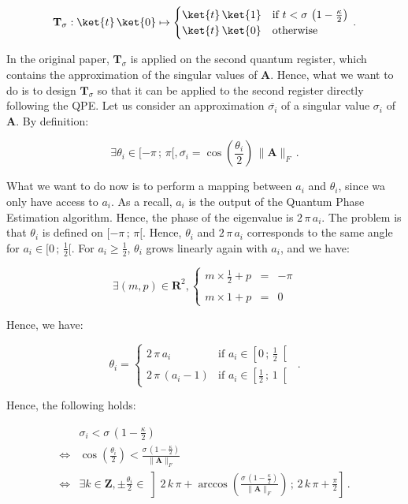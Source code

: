 \documentclass[11pt, a4paper]{article}
\begin{document}
                \[\mathbf{T}_\sigma:\ket{t}\,\ket{0}\mapsto\begin{cases}\ket{t}\,\ket{1} &\text{if } t < \sigma\,\left(1-\frac\kappa2\right)\\\ket{t}\,\ket{0}&\text{otherwise}\end{cases}\,.\]
                
                In the original paper, \(\mathbf{T}_\sigma\) is applied on the second quantum register, which contains the approximation of the singular values of \(\mathbf{A}\). Hence, what we want to do is to design \(\mathbf{T}_\sigma\) so that it can be applied to the second register directly following the QPE. Let us consider an approximation \(\overline{\sigma_i}\) of a singular value \(\sigma_i\) of \(\mathbf{A}\). By definition:
                
                \[\exists\theta_i\in[-\pi\,;\,\pi[,\overline{\sigma_i}=\cos\left(\frac{\theta_i}{2}\right)\,\|\mathbf{A}\|_F\,.\]
                
                What we want to do now is to perform a mapping between \(a_i\) and \(\theta_i\), since wa only have access to \(a_i\). As a recall, \(a_i\) is the output of the Quantum Phase Estimation algorithm. Hence, the phase of the eigenvalue is \(2\,\pi\,a_i\). The problem is that \(\theta_i\) is defined on \([-\pi\,;\,\pi[\). Hence, \(\theta_i\) and \(2\,\pi\,a_i\) corresponds to the same angle for \(a_i\in[0\,;\,\frac12[\). For \(a_i\geqslant\frac12\), \(\theta_i\) grows linearly again with \(a_i\), and we have:
                
                \[\exists(m,p)\in\mathbf{R}^2,\left\{\begin{array}{lcl}m\times\frac12+p &=& -\pi\\\\m\times1 + p &=& 0\end{array}\right.\]
                
                Hence, we have:
                
                \[\theta_i = \begin{cases}2\,\pi\,a_i&\text{if }a_i\in\left[0\,;\,\frac12\right[\\2\,\pi\,\left(a_i-1\right)&\text{if }a_i\in\left[\frac12\,;\,1\right[\end{cases}\,.\]
                
                Hence, the following holds:
                
                \begin{align*}
                    &\sigma_i < \sigma\,\left(1 - \frac\kappa2\right)\\
                    \iff&\cos\left(\frac{\theta_i}{2}\right) < \frac{\sigma\,\left(1 - \frac\kappa2\right)}{\|\mathbf{A}\|_F}\\
                    \iff&\exists k\in\mathbf{Z},\pm\frac{\theta_i}{2}\in\left]2\,k\,\pi + \arccos\left(\frac{\sigma\,\left(1 - \frac\kappa2\right)}{\|\mathbf{A}\|_F}\right)\,;\,2\,k\,\pi + \frac\pi2\right]\,.
                \end{align*}
                
\end{document}
